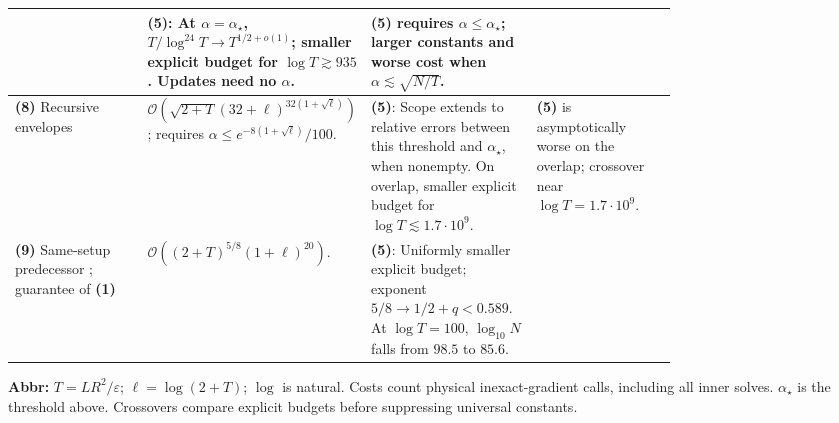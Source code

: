 \begin{table}[tp]
\begin{threeparttable}
\begin{tabularx}{\linewidth}{@{}>{\raggedright\arraybackslash}p{0.20\linewidth}>{\raggedright\arraybackslash}p{0.32\linewidth}>{\raggedright\arraybackslash}p{0.25\linewidth}>{\raggedright\arraybackslash}X@{}}
& \textbf{(5)}: At $\alpha=\alpha_\star$, $T/\log^{24}T\to T^{1/2+o(1)}$; smaller explicit budget for $\log T\gtrsim935$. Updates need no $\alpha$.
& \textbf{(5)} requires $\alpha\le\alpha_\star$; larger constants and worse cost when $\alpha\lesssim\sqrt{N/T}$. \\
\midrule
\textbf{(8)} Recursive envelopes \citep{srscRecursiveRepository}
& $\mathcal{O}\!\left(\sqrt{2+T}(32+\ell)^{32(1+\sqrt\ell)}\right)$; requires $\alpha\le e^{-8(1+\sqrt\ell)}/100$.
& \textbf{(5)}: Scope extends to relative errors between this threshold and $\alpha_\star$, when nonempty. On overlap, smaller explicit budget for $\log T\lesssim1.7\cdot10^9$.
& \textbf{(5)} is asymptotically worse on the overlap; crossover near $\log T=1.7\cdot10^9$. \\
\midrule
\textbf{(9)} Same-setup predecessor \citep{srscPolylogPredecessor}; guarantee of \textbf{(1)}
& $\mathcal{O}((2+T)^{5/8}(1+\ell)^{20})$.
& \textbf{(5)}: Uniformly smaller explicit budget; exponent $5/8\to1/2+q<0.589$. At $\log T=100$, $\log_{10}N$ falls from $98.5$ to $85.6$.
& \\
\bottomrule
\end{tabularx}
\begin{tablenotes}[flushleft]\footnotesize
\item[] \textbf{Abbr:} $T=LR^2/\varepsilon$; $\ell=\log(2+T)$; $\log$ is natural. Costs count physical inexact-gradient calls, including all inner solves. $\alpha_\star$ is the threshold above. Crossovers compare explicit budgets before suppressing universal constants.
\end{tablenotes}
\end{threeparttable}
\end{table}
